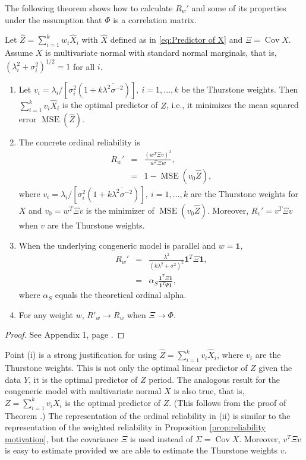 \documentclass[twoside]{article}
\DeclareMathOperator{\Cov}{Cov}
\DeclareMathOperator{\MSE}{MSE}
\renewcommand{\sqrt}[1]{{(#1)^{1/2}}}
\begin{document}
The following theorem shows how to calculate $ R_{w}'$ and
some of its properties under the assumption that $\Phi$ is a correlation matrix.
\begin{thm}
\label{thm:omega-prime}Let $\hat{Z}=\sum_{i=1}^{k}w_{i}\hat{X}_{i}$
with $\hat{X}$ defined as in \eqref{eq:Predictor of X} and $\Xi=\Cov\hat{X}$.
Assume $X$ is multivariate normal with standard normal marginals,
that is, $\sqrt{\lambda_{i}^{2}+\sigma_{i}^{2}}=1$ for all $i$.
\begin{enumerate}[label=(\roman*)]
\item Let  $v_{i}=\lambda_{i}/[\sigma_{i}^{2}(1+k\overline{\lambda^{2}\sigma^{-2}})],\:i=1,\ldots,k$ be the Thurstone weights. Then $\sum_{i=1}^{k}v_{i}\hat{X}_{i}$
is the optimal predictor of $Z$, i.e., it minimizes the mean squared
error $\MSE(\hat{Z})$.
\item The concrete ordinal reliability is
\begin{eqnarray}
 R_{w}' & = & \frac{(w^{T}\Xi v)^{2}}{w^{T}\Xi w},\label{eq:Omega prime}\\
 & = & 1-\MSE(v_{0}\hat{Z}),\nonumber 
\end{eqnarray}
where $v_{i}=\lambda_{i}/[\sigma_{i}^{2}(1+k\overline{\lambda^{2}\sigma^{-2}})],\:i=1,\ldots,k$
are the Thurstone weights for $X$ and $v_{0}=w^{T}\Xi v$ is the
minimizer of $\MSE(v_{0}\hat{Z})$. Moreover, $ R_{v}'=v^{T}\Xi v$ when $v$
are the Thurstone weights.
\item When the underlying congeneric model is parallel and $w=\boldsymbol{1}$,
\begin{eqnarray}
 R_{w}' & = & \frac{\lambda^{2}}{(k\lambda^{2}+\sigma^{2})^{2}}\boldsymbol{1}^{T}\Xi\boldsymbol{1},\label{eq:Alpha prime}\\
 & = & \alpha_S\frac{\boldsymbol{1}^{T}\Xi\boldsymbol{1}}{\boldsymbol{1}^{T}\Psi\boldsymbol{1}},\nonumber 
\end{eqnarray}
where $\alpha_S$ equals the theoretical ordinal alpha.
\item For any weight $w$, $ R'_{w}\to R_{w}$ when $\Xi\to\Phi$. 
\end{enumerate}
\end{thm}

\begin{proof}
See Appendix 1, page \pageref{proof:omega-prime}.
\end{proof}
Point (i) is a strong justification for using $\hat{Z}=\sum_{i=1}^{k}v_{i}\hat{X}_{i}$,
where $v_{i}$ are the Thurstone weights. This is not only the optimal
linear predictor of $Z$ given the data $Y$, it is the optimal predictor
of $Z$ period. The analogous result for the congeneric model with
multivariate normal $X$ is also true, that is, $Z=\sum_{i=1}^{k}v_{i}X_{i}$
is the optimal predictor of $Z$. (This follows from the proof of
Theorem \pageref{thm:omega-prime}.) The representation of the ordinal
reliability in (ii) is similar to the representation of the weighted
reliability in Proposition \ref{prop:reliability motivation}, but the covariance $\Xi$ is used
instead of $\Sigma = \Cov X$. Moreover, $v^{T}\Xi v$ is easy to estimate
provided we are able to estimate the Thurstone weights $v$. 
\end{document}
